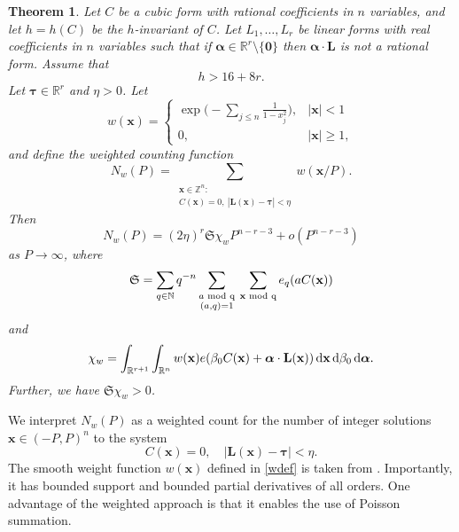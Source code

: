 \documentclass[12pt,reqno]{amsart}
\newtheorem{thm}{Theorem}[section]
\theoremstyle{definition}
\theoremstyle{remark}
\numberwithin{equation}{section}
\begin{document}
\begin{thm} \label{thm1} Let $C$ be a cubic form with rational coefficients in $n$ variables, and let $h = h(C)$ be the $h$-invariant of $C$. Let $L_1, \ldots, L_r$ be linear forms with real coefficients in $n$ variables such that if ${\boldsymbol{{\alpha}}} \in {\mathbb R}^r \setminus \{ {\mathbf 0} \}$ then ${\boldsymbol{{\alpha}}} \cdot {\mathbf L}$ is not a rational form. Assume that 
\begin{equation} \label{numvars}
h > 16 + 8 r.
\end{equation}
Let ${\boldsymbol{\tau}} \in {\mathbb R}^r$ and $\eta > 0$. Let
\begin{equation} \label{wdef}
w({\mathbf x}) = \begin{cases}
\exp \Biggl(- \displaystyle \sum_{j {\leqslant} n} \frac1 {1- x_j^2} \Biggr), & |{\mathbf x}| < 1 \\
0, & |{\mathbf x}| {\geqslant} 1,
\end{cases}
\end{equation}
and define the weighted counting function
\[
N_w(P) = \sum_{\substack{{\mathbf x} \in {\mathbb Z}^n: \\ C({\mathbf x}) = 0, \: |{\mathbf L}({\mathbf x}) - {\boldsymbol{\tau}}| < \eta}} w({\mathbf x} / P).
\]
Then
\begin{equation} \label{asymp}
N_w(P) = (2 \eta)^r {\mathfrak S} \chi_w P^{n-r-3} + o(P^{n-r-3})
\end{equation}
as $P \to \infty$, where
\begin{equation} \label{SS}
{\mathfrak S} = \sum_{q \in {\mathbb N}} q^{-n} \sum_{\substack{a {\,\,\rm{mod}\,\,q} \\ (a,q) = 1}} \:
\sum_{{\mathbf x} {\,\,\rm{mod}\,\,q}} e_q(aC({\mathbf x}))
\end{equation}
and
\begin{equation} \label{chidef}
\chi_w = \int_{{\mathbb R}^{r+1}} \int_{{\mathbb R}^n} w({\mathbf x})  e({{\beta}}_0 C({\mathbf x}) + {\boldsymbol{{\alpha}}} \cdot {\mathbf L}({\mathbf x})) {{\,{\rm d}}} {\mathbf x} {{\,{\rm d}}} {{\beta}}_0 {{\,{\rm d}}} {\boldsymbol{{\alpha}}}.
\end{equation}
Further, we have ${\mathfrak S} \chi_w > 0$.
\end{thm}

We interpret $N_w(P)$ as a weighted count for the number of integer solutions ${\mathbf x} \in (-P,P)^n$ to the system
\begin{equation} \label{system}
C({\mathbf x}) = 0, \quad |{\mathbf L}({\mathbf x}) - {\boldsymbol{\tau}}| < \eta.
\end{equation}
The smooth weight function $w({\mathbf x})$ defined in \eqref{wdef} is taken from \cite{HB1996}. Importantly, it has bounded support and bounded partial derivatives of all orders. One advantage of the weighted approach is that it enables the use of Poisson summation.
\end{document}
